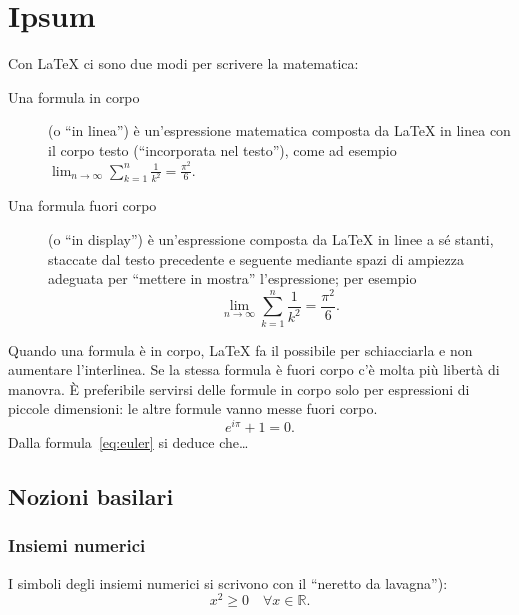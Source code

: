 
\chapter{Ipsum}
\label{cap:ipsum}


Con \LaTeX{} ci sono due modi per scrivere la matematica:
\begin{description}
\item[Una formula in corpo] (o ``in linea'') è un'espressione matematica composta da \LaTeX{} in linea con il corpo testo (``incorporata nel testo''), come ad esempio $\lim_{n \to \infty}\sum_{k=1}^n \frac{1}{k^2}= \frac{\pi^2}{6}$.
\item[Una formula fuori corpo] (o ``in display'') è un'espressione composta da \LaTeX{} in linee a sé stanti, staccate dal testo precedente e seguente mediante spazi di ampiezza adeguata per ``mettere in mostra'' l'espressione; per esempio
\[
\lim_{n \to \infty}\sum_{k=1}^n \frac{1}{k^2}= \frac{\pi^2}{6}.
\]
\end{description}

Quando una formula è in corpo, \LaTeX{} fa il possibile per schiacciarla e non aumentare l'interlinea. Se la stessa formula è fuori corpo c'è molta più libertà di manovra. È preferibile servirsi delle formule in corpo solo per espressioni di piccole dimensioni: le altre formule vanno messe fuori corpo.
\begin{equation}
\label{eq:euler}
e^{i\pi}+1=0.
\end{equation}
Dalla formula~\eqref{eq:euler} 
si deduce che\dots



\section{Nozioni basilari}

\subsection{Insiemi numerici}

I simboli degli insiemi numerici si scrivono con il ``neretto da lavagna''):
\begin{equation}
x^2 \geq 0 \quad
\forall x \in \mathbb{R}.
\end{equation}


